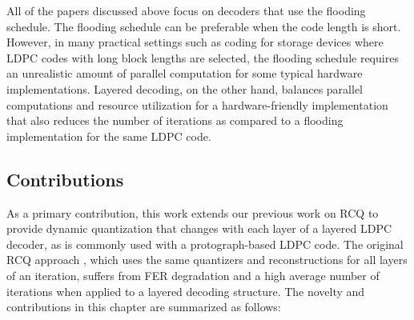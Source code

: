 \documentclass [PhD] {uclathes}
\begin{document}
All of the papers discussed above focus on decoders that use the flooding schedule. The flooding schedule can be preferable when the code length is short. However, in many practical settings such as coding for storage devices where  LDPC codes with long block lengths are selected, the flooding schedule requires an unrealistic amount of parallel  computation for some typical hardware implementations. Layered decoding\cite{shuffled}, on the other hand, balances parallel computations and resource utilization for a  hardware-friendly implementation that also reduces the number of iterations as compared to a flooding implementation for the same LDPC code.

\subsection{Contributions}
As a primary contribution, this work extends our previous work on RCQ \cite{Wang2020-RCQ} to provide dynamic quantization that changes with each layer of a layered LDPC decoder, as is commonly used with a protograph-based LDPC code.  The original RCQ approach \cite{Wang2020-RCQ}, which uses the same quantizers and reconstructions for all layers of an iteration, suffers from FER degradation and a high average number of iterations when applied to a layered decoding structure.  The novelty and contributions in this chapter are summarized as follows:
\end{document}
